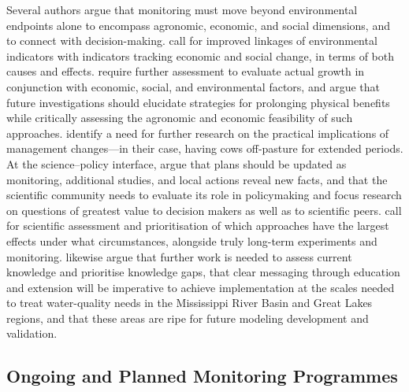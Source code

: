 \documentclass[11pt]{article}
\begin{document}
Several authors argue that monitoring must move beyond environmental endpoints alone to encompass agronomic, economic, and social dimensions, and to connect with decision-making. \textcite{Zhang2018} call for improved linkages of environmental indicators with indicators tracking economic and social change, in terms of both causes and effects. \textcite{Zhu2025} require further assessment to evaluate actual growth in conjunction with economic, social, and environmental factors, and \textcite{Brikmans2025} argue that future investigations should elucidate strategies for prolonging physical benefits while critically assessing the agronomic and economic feasibility of such approaches. \textcite{Monaghan2016} identify a need for further research on the practical implications of management changes---in their case, having cows off-pasture for extended periods. At the science--policy interface, \textcite{Letey1999} argue that plans should be updated as monitoring, additional studies, and local actions reveal new facts, and that the scientific community needs to evaluate its role in policymaking and focus research on questions of greatest value to decision makers as well as to scientific peers. \textcite{Clifford2023} call for scientific assessment and prioritisation of which approaches have the largest effects under what circumstances, alongside truly long-term experiments and monitoring. \textcite{Kalcic2018} likewise argue that further work is needed to assess current knowledge and prioritise knowledge gaps, that clear messaging through education and extension will be imperative to achieve implementation at the scales needed to treat water-quality needs in the Mississippi River Basin and Great Lakes regions, and that these areas are ripe for future modeling development and validation.

\subsection{Ongoing and Planned Monitoring Programmes}
\end{document}
